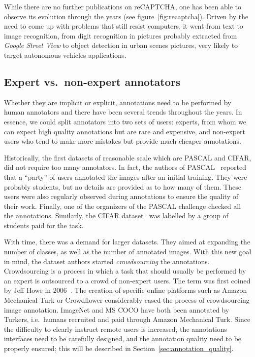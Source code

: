 While there are no further publications on reCAPTCHA,
one has been able to observe its evolution through the years (see figure~\ref{fig:recaptcha}).
Driven by the need to come up with problems that still resist computers,
it went from text to image recognition, from digit recognition
in pictures probably extracted from \textit{Google Street View} to object detection
in urban scenes pictures, very likely to target autonomous vehicles applications.

\subsection{Expert vs.\ non-expert annotators}

Whether they are implicit or explicit,
annotations need to be performed by human annotators and
there have been several trends throughout the years.
In essence, we could split annotators into two sets of users:
experts, from whom we can expect high quality annotations
but are rare and expensive, and non-expert users
who tend to make more mistakes but provide much cheaper annotations.

Historically, the first datasets of reasonable scale which are PASCAL and CIFAR,
did not require too many annotators.
In fact, the authors of PASCAL~\cite{Everingham10} reported that a ``party'' of users
annotated the images after an initial training.
They were probably students, but no details are provided as to how many of them.
These users were also regularly observed during annotations
to ensure the quality of their work.
Finally, one of the organizers of the PASCAL challenge checked all the annotations.
Similarly, the CIFAR dataset~\cite{krizhevsky2009learning}
was labelled by a group of students paid for the task.

With time, there was a demand for larger datasets.
They aimed at expanding the number of classes,
as well as the number of annotated images.
With this new goal in mind,
the dataset authors started \textit{crowdsourcing} the annotations.
Crowdsourcing is a process in which a task that should usually be performed
by an expert is outsourced to a crowd of non-expert users.
The term was first coined by Jeff Howe in 2006~\cite{howe2006rise}.
The creation of specific online platforms
such as Amazon Mechanical Turk or Crowdflower
considerably eased the process of crowdsourcing image annotation.
ImageNet and MS COCO have both been annotated by Turkers,
i.e.\ humans recruited and paid through Amazon Mechanical Turk.
Since the difficulty to clearly instruct remote users is increased,
the annotations interfaces need to be carefully designed,
and the annotation quality need to be properly ensured;
this will be described in Section~\ref{sec:annotation_quality}.


